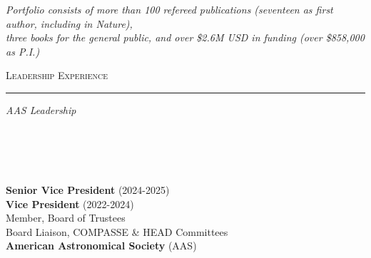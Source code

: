 \documentclass[11pt]{article}
\makeatletter
\def\vhrulefill#1{\leavevmode\leaders\hrule\@height#1\hfill \kern\z@}
\makeatother
\begin{document}



\vspace*{-2mm}

\begin{center}
\textit{Portfolio consists of more than 100 refereed publications (seventeen as first author, including in Nature), \\ three books for the general public, and over \$2.6M USD in funding (over \$858,000 as P.I.) }  \\
\end{center}




\textsc{Leadership Experience} \vhrulefill{0.4pt}


\vspace{6mm}


\hspace{2.5mm} \parbox{1.5in}{\textit{AAS Leadership}\\\\\\\\\\} \parbox{5.15in}{\textbf{Senior Vice President} (2024-2025)\\\textbf{Vice President} (2022-2024) \\ Member, Board of Trustees \\ Board Liaison, COMPASSE \& HEAD Committees  \\ \textbf{American Astronomical Society} (AAS) \\
}
\end{document}
